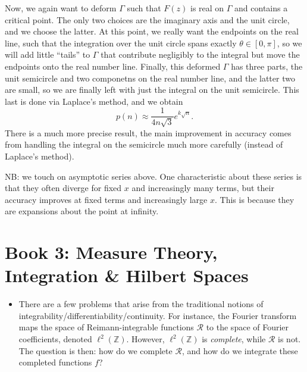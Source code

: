 \documentclass[11pt,
        usenames, %
        dvipsnames %
    ]{report}
\begin{document}
\begin{itemize}
        Now, we again want to deform $\Gamma$ such that $F(z)$ is real on
        $\Gamma$ and contains a critical point. The only two choices are the
        imaginary axis and the unit circle, and we choose the latter. At this
        point, we really want the endpoints on the real line, such that the
        integration over the unit circle spans exactly $\theta \in [0, \pi]$, so
        we will add little ``tails'' to $\Gamma$ that contribute negligibly to
        the integral but move the endpoints onto the real number line. Finally,
        this deformed $\Gamma$ has three parts, the unit semicircle and two
        componetns on the real number line, and the latter two are small, so we
        are finally left with just the integral on the unit semicircle. This
        last is done via Laplace's method, and we obtain
        \begin{equation}
            p(n) \approx \frac{1}{4n\sqrt{3}}e^{k\sqrt{n}}.
        \end{equation}
        There is a much more precise result, the main improvement in accuracy
        comes from handling the integral on the semicircle much more carefully
        (instead of Laplace's method).
\end{itemize}

NB\@: we touch on asymptotic series above. One characteristic about these series
is that they often diverge for fixed $x$ and increasingly many terms, but their
accuracy improves at fixed terms and increasingly large $x$. This is because
they are expansions about the point at infinity.

\section{Book 3: Measure Theory, Integration \& Hilbert Spaces}

\begin{itemize}
    \item There are a few problems that arise from the traditional notions of
        integrability/differentiability/continuity. For instance, the Fourier
        transform maps the space of Reimann-integrable functions $\mathcal{R}$ to
        the space of Fourier coefficients, denoted $\ell^2(\mathbb{Z})$.
        However, $\ell^2(\mathbb{Z})$ is \emph{complete}, while $\mathcal{R}$ is
        not. The question is then: how do we complete $\mathcal{R}$, and how do
        we integrate these completed functions $f$?
\end{itemize}
\end{document}
